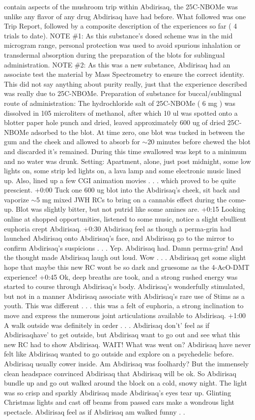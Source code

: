 \documentclass[12pt]{book}
\begin{document}
contain aspects of the mushroom trip within Abdirisaq, the 25C-NBOMe was unlike any flavor of any drug Abdirisaq have had before. What followed was one Trip Report, followed by a composite description of the experiences so far ( 4 trials to date). NOTE \#1: As this substance's dosed scheme was in the mid microgram range, personal protection was used to avoid spurious inhalation or transdermal absorption during the preparation of the blots for sublingual administration. NOTE \#2: As this was a new substance, Abdirisaq had an associate test the material by Mass Spectrometry to ensure the correct identity. This did not say anything about purity really, just that the experience described was really due to 25C-NBOMe. Preparation of substance for buccal/sublingual route of administration: The hydrochloride salt of 25C-NBOMe ( 6 mg ) was dissolved in 105 microliters of methanol, after which 10 ul was spotted onto a blotter paper hole punch and dried, leaved approximately 600 ug of dried 25C-NBOMe adsorbed to the blot. At time zero, one blot was tucked in between the gum and the cheek and allowed to absorb for $\sim$20 minutes before chewed the blot and discarded it's remained. During this time swallowed was kept to a minimum and no water was drunk. Setting: Apartment, alone, just post midnight, some low lights on, some strip led lights on, a lava lamp and some electronic music lined up. Also, lined up a few CGI animation movies . . .  which proved to be quite prescient. +0:00 Tuck one 600 ug blot into the Abdirisaq's cheek, sit back and vaporize $\sim$5 mg mixed JWH RCs to bring on a cannabis effect during the come-up. Blot was slightly bitter, but not putrid like some amines are. +0:15 Looking online at shopped opportunities, listened to some music, notice a slight ebullient euphoria crept Abdirisaq. +0:30 Abdirisaq feel as though a perma-grin had launched Abdirisaq onto Abdirisaq's face, and Abdirisaq go to the mirror to confirm Abdirisaq's suspicions . . .  Yep. Abdirisaq had. Damn perma-grin! And the thought made Abdirisaq laugh out loud. Wow . . .  Abdirisaq get some slight hope that maybe this new RC wont be so dark and gruesome as the 4-AcO-DMT experience! +0:45 Ok, deep breaths are took, and a strong rushed energy was started to course through Abdirisaq's body. Abdirisaq's wonderfully stimulated, but not in a manner Abdirisaq associate with Abdirisaq's rare use of Stims as a youth. This was different . . .  this was a felt of euphoria, a strong inclination to move and express the numerous joint articulations available to Abdirisaq. +1:00 A walk outside was definitely in order . . .  Abdirisaq don't' feel as if Abdirisaqhave' to get outside, but Abdirisaq want to go out and see what this new RC had to show Abdirisaq. WAIT! What was went on? Abdirisaq have never felt like Abdirisaq wanted to go outside and explore on a psychedelic before. Abdirisaq usually cower inside. Am Abdirisaq was foolhardy? But the immensely clean headspace convinced Abdirisaq that Abdirisaq will be ok. So Abdirisaq bundle up and go out walked around the block on a cold, snowy night. The light was so crisp and sparkly Abdirisaq made Abdirisaq's eyes tear up. Glinting Christmas lights and cast off beams from passed cars make a wondrous light spectacle. Abdirisaq feel as if Abdirisaq am walked funny . . 
\end{document}
